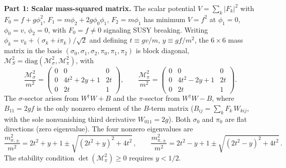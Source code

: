 
\textbf{Part 1: Scalar mass-squared matrix.}
The scalar potential $V = \sum_k |F_k|^2$ with $F_0 = f + g\phi_1^2$,
$F_1 = m\phi_2 + 2g\phi_0\phi_1$, $F_2 = m\phi_1$ has minimum $V = f^2$
at $\phi_1 = 0$, $\phi_0 = v$, $\phi_2 = 0$, with $F_0 = f \neq 0$ signaling
SUSY breaking. Writing $\phi_k = v_k + (\sigma_k + i\pi_k)/\sqrt{2}$ and
defining $t \equiv gv/m$, $y \equiv gf/m^2$, the $6 \times 6$ mass matrix
in the basis $(\sigma_0, \sigma_1, \sigma_2, \pi_0, \pi_1, \pi_2)$ is block
diagonal, $\mathcal{M}^2_S = \mathrm{diag}(\mathcal{M}^2_\sigma, \mathcal{M}^2_\pi)$, with
\begin{equation}
  \frac{\mathcal{M}^2_\sigma}{m^2}
  = \begin{pmatrix} 0 & 0 & 0 \\ 0 & 4t^2{+}2y{+}1 & 2t \\ 0 & 2t & 1 \end{pmatrix}, \qquad
  \frac{\mathcal{M}^2_\pi}{m^2}
  = \begin{pmatrix} 0 & 0 & 0 \\ 0 & 4t^2{-}2y{+}1 & 2t \\ 0 & 2t & 1 \end{pmatrix}.
\end{equation}
The $\sigma$-sector arises from $W^\dagger W + B$ and the $\pi$-sector from
$W^\dagger W - B$, where $B_{11} = 2gf$ is the only nonzero element of the
$B$-term matrix ($B_{ij} = \sum_k F_k\, W_{kij}$, with the sole nonvanishing
third derivative $W_{011} = 2g$). Both $\sigma_0$ and $\pi_0$ are flat
directions (zero eigenvalue). The four nonzero eigenvalues are
\begin{equation}
  \frac{m^2_{\sigma,\pm}}{m^2} = 2t^2 + y + 1 \pm \sqrt{(2t^2 + y)^2 + 4t^2}\,, \qquad
  \frac{m^2_{\pi,\pm}}{m^2} = 2t^2 - y + 1 \pm \sqrt{(2t^2 - y)^2 + 4t^2}\,.
\end{equation}
The stability condition $\det(\mathcal{M}^2_\pi) \geq 0$ requires $y < 1/2$.

